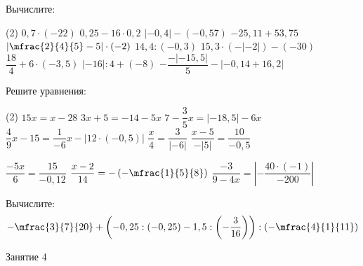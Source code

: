 \begin{exam}
	\begin{listofex}
		\item Вычислите:
		\begin{tasks}(2)
			\task \( 0,7 \cdot (-22) \)
			\task \( 0,25 - 16 \cdot 0,2 \)
			\task \( |-0,4| - (-0,57) \)
			\task \( -25,11 + 53,75 \)
			\task \( \left| \mfrac{2}{4}{5} - 5 \right| \cdot (-2) \)
			\task \( 14,4 : (-0,3) \)
			\task \( 15,3 \cdot (-|-2|) - (-30) \)
			\task \( \dfrac{18}{4} + 6 \cdot (-3,5) \)
			\task \( |-16| : 4 + (-8) \)
			\task \( -\dfrac{-|-15,5|}{5} - |-0,14+16,2| \)
		\end{tasks}
		\item Решите уравнения:
		\begin{tasks}(2)
			\task \( 15x=x-28 \)
			\task \( 3x+5=-14-5x \)
			\task \( 7-\dfrac{3}{5}x=|-18,5|-6x \)
			\task \( \dfrac{4}{9}x-15=\dfrac{1}{-6}x-|12 \cdot (-0,5)| \)
			\task \( \dfrac{x}{4} = \dfrac{3}{|-6|} \)
			\task \( \dfrac{x-5}{-|5|} = \dfrac{10}{-0,5} \)
			
			\task \( \dfrac{-5x}{6} = \dfrac{15}{-0,12} \)
			\task \( \dfrac{x-2}{14} = -\left( -\mfrac{1}{5}{8} \right) \)
			\task \( \dfrac{-3}{9-4x} = \left| -\dfrac{40 \cdot (-1)}{-200} \right| \)
		\end{tasks}
		\item Вычислите: %
		\[ -\mfrac{3}{7}{20} + \left( -0,25 : (-0,25) - 1,5 : \left( -\dfrac{3}{16} \right) \right) : \left( -\mfrac{4}{1}{11} \right)  \]
	\end{listofex}
\end{exam}

\begin{class}[number=4]
	\begin{listofex}
		\item Занятие 4
	\end{listofex}
\end{class}

